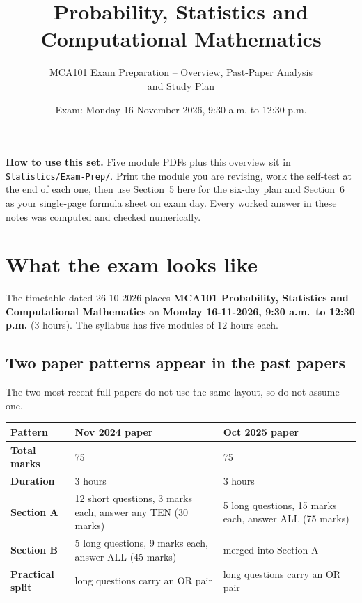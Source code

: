 \documentclass[11pt,a4paper]{article}
\title{\textbf{Probability, Statistics and Computational Mathematics}\\}
\author{\large MCA101 Exam Preparation -- Overview, Past-Paper Analysis\\and Study Plan}
\date{Exam: Monday 16 November 2026, 9:30 a.m. to 12:30 p.m.}
\begin{document}
\maketitle

\begin{exambox}
\textbf{How to use this set.} Five module PDFs plus this overview sit in \texttt{Statistics/Exam-Prep/}. Print the module you are revising, work the self-test at the end of each one, then use Section~5 here for the six-day plan and Section~6 as your single-page formula sheet on exam day. Every worked answer in these notes was computed and checked numerically.
\end{exambox}

\tableofcontents
\newpage

\section{What the exam looks like}

The timetable dated 26-10-2026 places \textbf{MCA101 Probability, Statistics and Computational Mathematics} on \textbf{Monday 16-11-2026, 9:30 a.m.\ to 12:30 p.m.} (3 hours). The syllabus has five modules of 12 hours each.

\subsection{Two paper patterns appear in the past papers}

The two most recent full papers do not use the same layout, so do not assume one.

\begin{center}\small
\begin{tabularx}{\textwidth}{>{\bfseries}p{} X X}
\toprule Pattern & Nov 2024 paper & Oct 2025 paper\\\midrule
Total marks & 75 & 75\\
Duration & 3 hours & 3 hours\\
Section A & 12 short questions, 3 marks each, answer any TEN (30 marks) & 5 long questions, 15 marks each, answer ALL (75 marks)\\
Section B & 5 long questions, 9 marks each, answer ALL (45 marks) & merged into Section A\\
Practical split & long questions carry an OR pair & long questions carry an OR pair\\\bottomrule
\end{tabularx}
\end{center}
\end{document}
